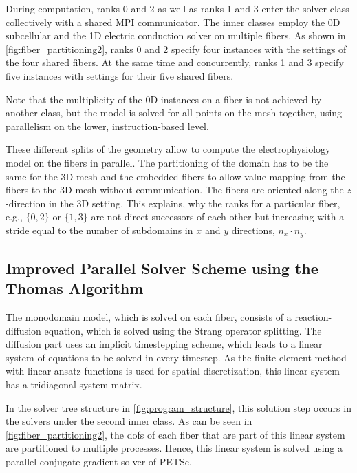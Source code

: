 During computation, ranks 0 and 2 as well as ranks 1 and 3 enter the  solver class collectively with a shared MPI communicator.
The inner  classes employ the 0D subcellular and the 1D electric conduction solver on multiple fibers. As shown in \cref{fig:fiber_partitioning2}, ranks 0 and 2 specify four instances with the settings of the four shared fibers. At the same time and concurrently, ranks 1 and 3 specify five instances with settings for their five shared fibers. 

Note that the multiplicity of the 0D instances on a fiber is not achieved by another  class, but the model is solved for all points on the mesh together, using parallelism on the lower, instruction-based level.

These different splits of the geometry allow to compute the electrophysiology model on the fibers in parallel. The partitioning of the domain has to be the same for the 3D mesh and the embedded fibers to allow value mapping from the fibers to the 3D mesh without communication. The fibers are oriented along the $z$-direction in the 3D setting. This explains, why the ranks for a particular fiber, e.g., $\{0,2\}$ or $\{1,3\}$ are not direct successors of each other but increasing with a stride equal to the number of subdomains in $x$ and $y$ directions, $n_x \cdot n_y$.

\subsection{Improved Parallel Solver Scheme using the Thomas Algorithm}\label{sec:improved_parallel_solver_for_fiber_based}

The monodomain model, which is solved on each fiber, consists of a reaction-diffusion equation, which is solved using the Strang operator splitting.
The diffusion part uses an implicit timestepping scheme, which leads to a linear system of equations to be solved in every timestep.
As the finite element method with linear ansatz functions is used for spatial discretization, this linear system has a tridiagonal system matrix.

In the solver tree structure in \cref{fig:program_structure}, this solution step occurs in the solvers under the second inner  class.  As can be seen in \cref{fig:fiber_partitioning2}, the dofs of each fiber that are part of this linear system are partitioned to multiple processes. Hence, this linear system is solved using a parallel conjugate-gradient solver of PETSc.

